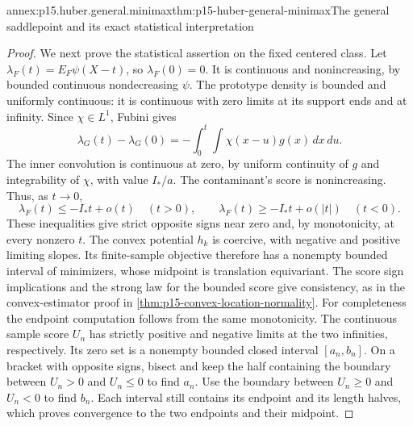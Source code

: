 \begin{annexitem}{annex:p15.huber.general.minimax}{thm:p15-huber-general-minimax}{The general saddlepoint and its exact statistical interpretation}
\begin{proof}
We next prove the statistical assertion on the fixed centered class.
Let \(\lambda_F(t)=E_F\psi(X-t)\), so \(\lambda_F(0)=0\).
It is continuous and nonincreasing, by bounded continuous
nondecreasing \(\psi\). The prototype density is bounded and uniformly
continuous: it is continuous with zero limits at its support ends
and at infinity. Since \(\chi\in L^1\), Fubini gives
\[
 \lambda_G(t)-\lambda_G(0)
       =-\int_0^t\int\chi(x-u)g(x)\,dx\,du .
\]
The inner convolution is continuous at zero, by uniform continuity
of \(g\) and integrability of \(\chi\), with value \(I_*/a\).
The contaminant's score is nonincreasing. Thus, as \(t\to0\),
\[
 \lambda_F(t)\leq-I_*t+o(t)\quad(t>0),\qquad
 \lambda_F(t)\geq-I_*t+o(|t|)\quad(t<0).
\]
These inequalities give strict opposite signs near zero and,
by monotonicity, at every nonzero \(t\).
The convex potential \(h_k\) is coercive, with negative and positive
limiting slopes. Its finite-sample objective therefore has a nonempty
bounded interval of minimizers, whose midpoint is translation
equivariant. The score sign implications and the strong law for the
bounded score give consistency, as in the convex-estimator proof
in \cref{thm:p15-convex-location-normality}.
For completeness the endpoint computation follows from the same
monotonicity. The continuous sample score \(U_n\) has strictly
positive and negative limits at the two infinities, respectively.
Its zero set is a nonempty bounded closed interval \([a_n,b_n]\).
On a bracket with opposite signs, bisect and keep the half containing
the boundary between \(U_n>0\) and \(U_n\leq0\) to find \(a_n\).
Use the boundary between \(U_n\geq0\) and \(U_n<0\) to find \(b_n\).
Each interval still contains its endpoint and its length halves,
which proves convergence to the two endpoints and their midpoint.


\end{proof}
\end{annexitem}
